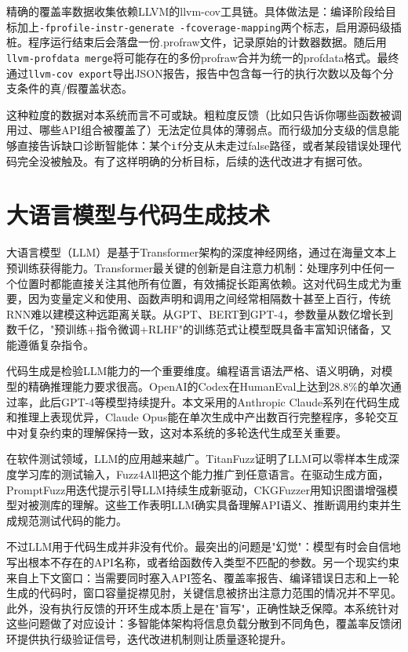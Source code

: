 精确的覆盖率数据收集依赖LLVM的llvm-cov工具链\cite{llvmcov2024}。具体做法是：编译阶段给目标加上\texttt{-fprofile-instr-generate -fcoverage-mapping}两个标志，启用源码级插桩。程序运行结束后会落盘一份.profraw文件，记录原始的计数器数据。随后用\texttt{llvm-profdata merge}将可能存在的多份profraw合并为统一的profdata格式。最终通过\texttt{llvm-cov export}导出JSON报告，报告中包含每一行的执行次数以及每个分支条件的真/假覆盖状态。

这种粒度的数据对本系统而言不可或缺。粗粒度反馈（比如只告诉你哪些函数被调用过、哪些API组合被覆盖了）无法定位具体的薄弱点。而行级加分支级的信息能够直接告诉缺口诊断智能体：某个\texttt{if}分支从未走过false路径，或者某段错误处理代码完全没被触及。有了这样明确的分析目标，后续的迭代改进才有据可依。

\section{大语言模型与代码生成技术}

大语言模型（LLM）是基于Transformer架构\cite{vaswani2023}的深度神经网络，通过在海量文本上预训练获得能力。Transformer最关键的创新是自注意力机制：处理序列中任何一个位置时都能直接关注其他所有位置，有效捕捉长距离依赖。这对代码生成尤为重要，因为变量定义和使用、函数声明和调用之间经常相隔数十甚至上百行，传统RNN难以建模这种远距离关联。从GPT\cite{radford2018}、BERT\cite{devlin2018}到GPT-4\cite{openai2023}，参数量从数亿增长到数千亿，"预训练+指令微调+RLHF"的训练范式让模型既具备丰富知识储备，又能遵循复杂指令\cite{yang2023}。

代码生成是检验LLM能力的一个重要维度。编程语言语法严格、语义明确，对模型的精确推理能力要求很高。OpenAI的Codex在HumanEval上达到28.8\%的单次通过率\cite{chen2021a}，此后GPT-4等模型持续提升。本文采用的Anthropic Claude系列\cite{anthropic2024claude}在代码生成和推理上表现优异，Claude Opus能在单次生成中产出数百行完整程序，多轮交互中对复杂约束的理解保持一致，这对本系统的多轮迭代生成至关重要。


在软件测试领域，LLM的应用越来越广。TitanFuzz\cite{deng2023b}证明了LLM可以零样本生成深度学习库的测试输入，Fuzz4All\cite{xia2024}把这个能力推广到任意语言。在驱动生成方面，PromptFuzz\cite{lyu2024}用迭代提示引导LLM持续生成新驱动，CKGFuzzer\cite{xu2024}用知识图谱增强模型对被测库的理解。这些工作表明LLM确实具备理解API语义、推断调用约束并生成规范测试代码的能力。

不过LLM用于代码生成并非没有代价。最突出的问题是"幻觉"：模型有时会自信地写出根本不存在的API名称，或者给函数传入类型不匹配的参数。另一个现实约束来自上下文窗口：当需要同时塞入API签名、覆盖率报告、编译错误日志和上一轮生成的代码时，窗口容量捉襟见肘，关键信息被挤出注意力范围的情况并不罕见\cite{liu2024lost}。此外，没有执行反馈的开环生成本质上是在"盲写"，正确性缺乏保障。本系统针对这些问题做了对应设计：多智能体架构将信息负载分散到不同角色，覆盖率反馈闭环提供执行级验证信号，迭代改进机制则让质量逐轮提升。

